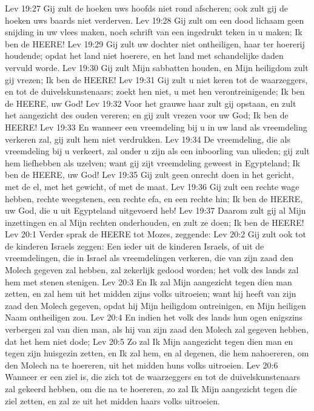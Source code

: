 Lev 19:27  Gij zult de hoeken uws hoofds niet rond afscheren; ook zult gij de hoeken uws baards niet verderven.
Lev 19:28  Gij zult om een dood lichaam geen snijding in uw vlees maken, noch schrift van een ingedrukt teken in u maken; Ik ben de HEERE!
Lev 19:29  Gij zult uw dochter niet ontheiligen, haar ter hoererij houdende; opdat het land niet hoerere, en het land met schandelijke daden vervuld worde.
Lev 19:30  Gij zult Mijn sabbatten houden, en Mijn heiligdom zult gij vrezen; Ik ben de HEERE!
Lev 19:31  Gij zult u niet keren tot de waarzeggers, en tot de duivelskunstenaars; zoekt hen niet, u met hen verontreinigende; Ik ben de HEERE, uw God!
Lev 19:32  Voor het grauwe haar zult gij opstaan, en zult het aangezicht des ouden vereren; en gij zult vrezen voor uw God; Ik ben de HEERE!
Lev 19:33  En wanneer een vreemdeling bij u in uw land als vreemdeling verkeren zal, gij zult hem niet verdrukken.
Lev 19:34  De vreemdeling, die als vreemdeling bij u verkeert, zal onder u zijn als een inboorling van ulieden; gij zult hem liefhebben als uzelven; want gij zijt vreemdeling geweest in Egypteland; Ik ben de HEERE, uw God!
Lev 19:35  Gij zult geen onrecht doen in het gericht, met de el, met het gewicht, of met de maat.
Lev 19:36  Gij zult een rechte wage hebben, rechte weegstenen, een rechte efa, en een rechte hin; Ik ben de HEERE, uw God, die u uit Egypteland uitgevoerd heb!
Lev 19:37  Daarom zult gij al Mijn inzettingen en al Mijn rechten onderhouden, en zult ze doen; Ik ben de HEERE!
Lev 20:1  Verder sprak de HEERE tot Mozes, zeggende:
Lev 20:2  Gij zult ook tot de kinderen Israels zeggen: Een ieder uit de kinderen Israels, of uit de vreemdelingen, die in Israel als vreemdelingen verkeren, die van zijn zaad den Molech gegeven zal hebben, zal zekerlijk gedood worden; het volk des lands zal hem met stenen stenigen.
Lev 20:3  En Ik zal Mijn aangezicht tegen dien man zetten, en zal hem uit het midden zijns volks uitroeien; want hij heeft van zijn zaad den Molech gegeven, opdat hij Mijn heiligdom ontreinigen, en Mijn heiligen Naam ontheiligen zou.
Lev 20:4  En indien het volk des lands hun ogen enigszins verbergen zal van dien man, als hij van zijn zaad den Molech zal gegeven hebben, dat het hem niet dode;
Lev 20:5  Zo zal Ik Mijn aangezicht tegen dien man en tegen zijn huisgezin zetten, en Ik zal hem, en al degenen, die hem nahoereren, om den Molech na te hoereren, uit het midden huns volks uitroeien.
Lev 20:6  Wanneer er een ziel is, die zich tot de waarzeggers en tot de duivelskunstenaars zal gekeerd hebben, om die na te hoereren, zo zal Ik Mijn aangezicht tegen die ziel zetten, en zal ze uit het midden haars volks uitroeien.
